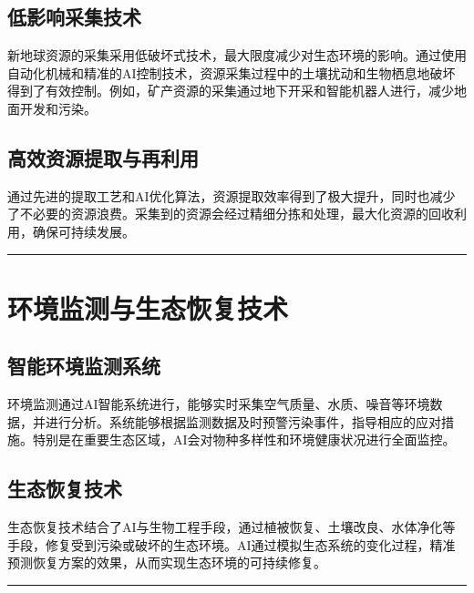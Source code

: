 \subsection{低影响采集技术}\label{ux4f4eux5f71ux54cdux91c7ux96c6ux6280ux672f}

新地球资源的采集采用低破坏式技术，最大限度减少对生态环境的影响。通过使用自动化机械和精准的AI控制技术，资源采集过程中的土壤扰动和生物栖息地破坏得到了有效控制。例如，矿产资源的采集通过地下开采和智能机器人进行，减少地面开发和污染。

\subsection{高效资源提取与再利用}\label{ux9ad8ux6548ux8d44ux6e90ux63d0ux53d6ux4e0eux518dux5229ux7528}

通过先进的提取工艺和AI优化算法，资源提取效率得到了极大提升，同时也减少了不必要的资源浪费。采集到的资源会经过精细分拣和处理，最大化资源的回收利用，确保可持续发展。

\begin{center}\rule{0.5\linewidth}{0.5pt}\end{center}

\section{环境监测与生态恢复技术}\label{ux73afux5883ux76d1ux6d4bux4e0eux751fux6001ux6062ux590dux6280ux672f}

\subsection{智能环境监测系统}\label{ux667aux80fdux73afux5883ux76d1ux6d4bux7cfbux7edf}

环境监测通过AI智能系统进行，能够实时采集空气质量、水质、噪音等环境数据，并进行分析。系统能够根据监测数据及时预警污染事件，指导相应的应对措施。特别是在重要生态区域，AI会对物种多样性和环境健康状况进行全面监控。

\subsection{生态恢复技术}\label{ux751fux6001ux6062ux590dux6280ux672f}

生态恢复技术结合了AI与生物工程手段，通过植被恢复、土壤改良、水体净化等手段，修复受到污染或破坏的生态环境。AI通过模拟生态系统的变化过程，精准预测恢复方案的效果，从而实现生态环境的可持续修复。

\begin{center}\rule{0.5\linewidth}{0.5pt}\end{center}

